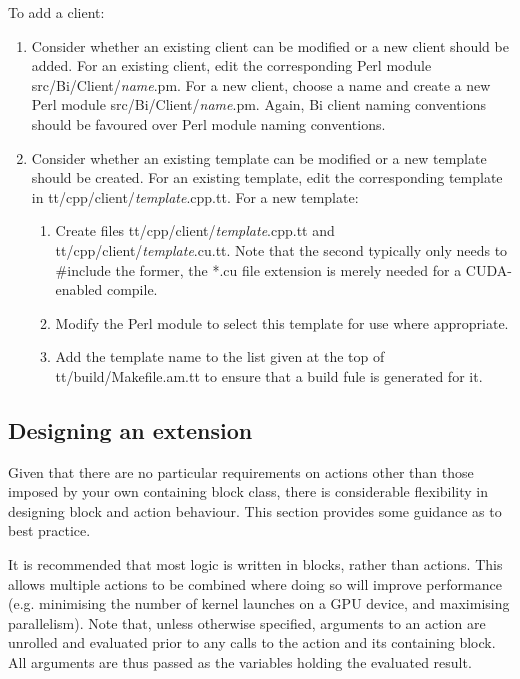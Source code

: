 To add a client:
\begin{enumerate}
\item Consider whether an existing client can be modified or a new client
  should be added. For an existing client, edit the corresponding Perl module
  \textsf{src/Bi/Client/\textit{name}.pm}. For a new client, choose a name
  and create a new Perl module \textsf{src/Bi/Client/\textit{name}.pm}. Again,
  Bi client naming conventions should be favoured over Perl module naming
  conventions.
\item Consider whether an existing template can be modified or a new template
  should be created. For an existing template, edit the corresponding template
  in \textsf{tt/cpp/client/\textit{template}.cpp.tt}. For a new template:
\begin{enumerate}
\item Create files \textsf{tt/cpp/client/\textit{template}.cpp.tt} and
  \textsf{tt/cpp/client/\textit{template}.cu.tt}. Note that the second
  typically only needs to \textsf{\#include} the former, the \textsf{*.cu}
  file extension is merely needed for a CUDA-enabled compile.
\item Modify the Perl module to select this template for use where
  appropriate.
\item Add the template name to the list given at the top of
  \textsf{tt/build/Makefile.am.tt} to ensure that a build fule is generated
  for it.
\end{enumerate}
\end{enumerate}

\subsection{Designing an extension\label{Designing_an_extension}}

Given that there are no particular requirements on actions other than those
imposed by your own containing block class, there is considerable flexibility
in designing block and action behaviour. This section provides some guidance
as to best practice.

It is recommended that most logic is written in blocks, rather than
actions. This allows multiple actions to be combined where doing so will
improve performance (e.g. minimising the number of kernel launches on a GPU
device, and maximising parallelism). Note that, unless otherwise specified,
arguments to an action are unrolled and evaluated prior to any calls to the
action and its containing block. All arguments are thus passed as the
variables holding the evaluated result.

